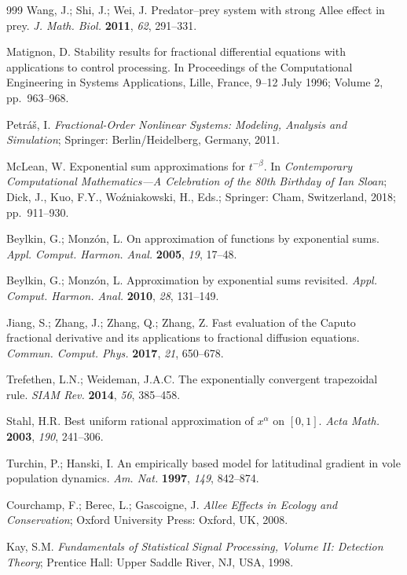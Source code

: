 \documentclass[mathematics,article,accept,pdftex,moreauthors]{Definitions/mdpi}
\begin{document}
\begin{thebibliography}{999}
 Wang, J.; Shi, J.; Wei, J. Predator--prey system with strong Allee effect in prey. \textit{J. Math. Biol.} \textbf{2011}, \emph{62}, 291--331.

 Matignon, D. Stability results for fractional differential equations with applications to control processing. In Proceedings of the Computational Engineering in Systems Applications, Lille, France, 9--12 July 1996; Volume 2, pp.~963--968.

 Petr\'a\v{s}, I. \textit{Fractional-Order Nonlinear Systems: Modeling, Analysis and Simulation}; Springer: Berlin/Heidelberg, Germany, 2011.

 McLean, W. Exponential sum approximations for $t^{-\beta}$. In \textit{Contemporary Computational Mathematics---A Celebration of the 80th Birthday of Ian Sloan}; Dick, J., Kuo, F.Y., Wo\'zniakowski, H., Eds.; Springer: Cham, Switzerland, 2018; pp.~911--930.

 Beylkin, G.; Monz\'on, L. On approximation of functions by exponential sums. \textit{Appl. Comput. Harmon. Anal.} \textbf{2005}, \emph{19}, 17--48.

 Beylkin, G.; Monz\'on, L. Approximation by exponential sums revisited. \textit{Appl. Comput. Harmon. Anal.} \textbf{2010}, \emph{28}, 131--149.

 Jiang, S.; Zhang, J.; Zhang, Q.; Zhang, Z. Fast evaluation of the Caputo fractional derivative and its applications to fractional diffusion equations. \textit{Commun. Comput. Phys.} \textbf{2017}, \emph{21}, 650--678.

 Trefethen, L.N.; Weideman, J.A.C. The exponentially convergent trapezoidal rule. \textit{SIAM Rev.} \textbf{2014}, \emph{56}, 385--458.

 Stahl, H.R. Best uniform rational approximation of $x^{\alpha}$ on $[0,1]$. \textit{Acta Math.} \textbf{2003}, \emph{190}, 241--306.

 Turchin, P.; Hanski, I. An empirically based model for latitudinal gradient in vole population dynamics. \textit{Am. Nat.} \textbf{1997}, \emph{149}, 842--874.

 Courchamp, F.; Berec, L.; Gascoigne, J. \textit{Allee Effects in Ecology and Conservation}; Oxford University Press: Oxford, UK, 2008.

 Kay, S.M. \textit{Fundamentals of Statistical Signal Processing, Volume II: Detection Theory}; Prentice Hall: Upper Saddle River, NJ, USA, 1998.


\end{thebibliography}
\end{document}
